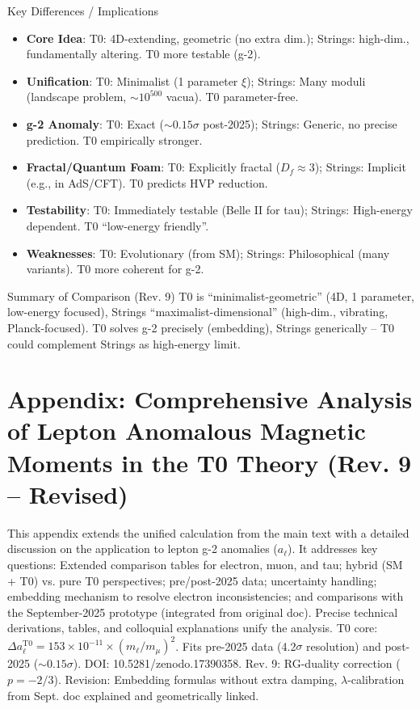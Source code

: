\documentclass[12pt,a4paper]{article}
\theoremstyle{definition}
\begin{document}
	\begin{interpretation}{Key Differences / Implications}
		\begin{itemize}
			\item \textbf{Core Idea}: T0: 4D-extending, geometric (no extra dim.); Strings: high-dim., fundamentally altering. T0 more testable (g-2).
			\item \textbf{Unification}: T0: Minimalist (1 parameter $\xi$); Strings: Many moduli (landscape problem, $\sim 10^{500}$ vacua). T0 parameter-free.
			\item \textbf{g-2 Anomaly}: T0: Exact ($\sim 0.15\sigma$ post-2025); Strings: Generic, no precise prediction. T0 empirically stronger.
			\item \textbf{Fractal/Quantum Foam}: T0: Explicitly fractal ($D_f \approx 3$); Strings: Implicit (e.g., in AdS/CFT). T0 predicts HVP reduction.
			\item \textbf{Testability}: T0: Immediately testable (Belle II for tau); Strings: High-energy dependent. T0 ``low-energy friendly''.
			\item \textbf{Weaknesses}: T0: Evolutionary (from SM); Strings: Philosophical (many variants). T0 more coherent for g-2.
		\end{itemize}
	\end{interpretation}
	
	\begin{result}{Summary of Comparison (Rev. 9)}
		T0 is ``minimalist-geometric'' (4D, 1 parameter, low-energy focused), Strings ``maximalist-dimensional'' (high-dim., vibrating, Planck-focused). T0 solves g-2 precisely (embedding), Strings generically -- T0 could complement Strings as high-energy limit.
	\end{result}
	
	\appendix
	\section{Appendix: Comprehensive Analysis of Lepton Anomalous Magnetic Moments in the T0 Theory (Rev. 9 -- Revised)}
	
	This appendix extends the unified calculation from the main text with a detailed discussion on the application to lepton g-2 anomalies ($a_\ell$). It addresses key questions: Extended comparison tables for electron, muon, and tau; hybrid (SM + T0) vs. pure T0 perspectives; pre/post-2025 data; uncertainty handling; embedding mechanism to resolve electron inconsistencies; and comparisons with the September-2025 prototype (integrated from original doc). Precise technical derivations, tables, and colloquial explanations unify the analysis. T0 core: $\Delta a_\ell^\text{T0} = 153 \times 10^{-11} \times (m_\ell / m_\mu)^2$. Fits pre-2025 data (4.2$\sigma$ resolution) and post-2025 ($\sim 0.15\sigma$). DOI: 10.5281/zenodo.17390358. Rev. 9: RG-duality correction ($p=-2/3$). Revision: Embedding formulas without extra damping, $\lambda$-calibration from Sept. doc explained and geometrically linked.
	
\end{document}
